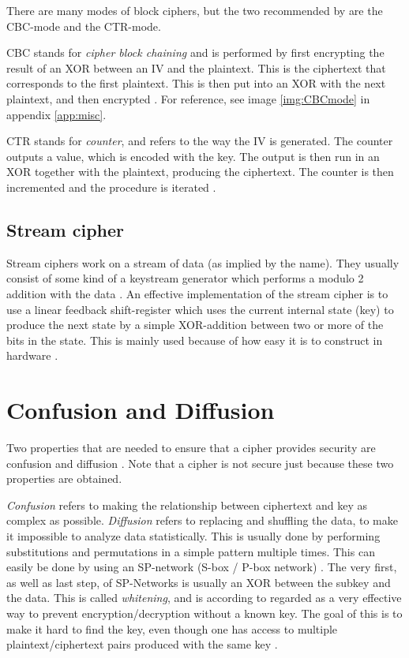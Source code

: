 There are many modes of block ciphers, but the two recommended by 
\citet{Schneier:2003} are the CBC-mode and the CTR-mode.

CBC stands for \emph{cipher block chaining} and is performed by first encrypting 
the result of an XOR between an IV and the plaintext. This is the ciphertext 
that corresponds to the first plaintext. This is then put into an XOR with the 
next plaintext, and then encrypted \citep[pp. 109--111]{Stinson:2006}. For 
reference, see image \ref{img:CBCmode} in appendix \ref{app:misc}.

CTR stands for \emph{counter}, and refers to the way the IV is generated. The
counter outputs a value, which is encoded with the key. The output is then run 
in an XOR together with the plaintext, producing the ciphertext. The counter is 
then incremented and the procedure is iterated \citep[p. 111]{Stinson:2006}.

\subsection{Stream cipher} \label{sec:StreamCipher}
Stream ciphers work on a stream of data (as implied by the name). They usually 
consist of some kind of a keystream generator which performs a modulo 2 addition
with the data \cite[pp. 67]{Simmons:1992}. An effective implementation of the 
stream cipher is to use a linear feedback shift-register which uses the current 
internal state (key) to produce the next state by a simple XOR-addition between 
two or more of the bits in the state. This is mainly used because of how easy
it is to construct in hardware \citep{LFSR:2008}.


\section{Confusion and Diffusion}\label{ch:ConfDiff}
Two properties that are needed to ensure that a cipher provides security are 
confusion and diffusion \citep{Shannon:1949}. Note that a cipher is not secure 
just because these two properties are obtained.

\emph{Confusion} refers to making the relationship between ciphertext and key as 
complex as possible. \emph{Diffusion} refers to replacing and shuffling the 
data, to make it impossible to analyze data statistically. This is usually done 
by performing substitutions and permutations in a simple pattern multiple times. 
This can easily be done by using an SP-network (S-box / P-box network) 
\citep[pp. 74--79]{Stinson:2006}. The very first, as well as last step, of 
SP-Networks is usually an XOR between the subkey and the data. This is called 
\emph{whitening}, and is according to \citet[p. 75]{Stinson:2006} regarded as a 
very effective way to prevent encryption/decryption without a known key. 
The goal of this is to make it hard to find the key, even though one has access 
to multiple plaintext/ciphertext pairs produced with the same key 
\citep{Shannon:1949}.

